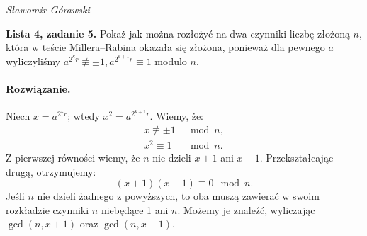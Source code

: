 \documentclass{article}
\begin{document}
\begin{flushright}
\textit{Sławomir Górawski}
\end{flushright}
\bigskip

\noindent\textbf{Lista 4, zadanie 5.}
Pokaż jak można rozłożyć na dwa czynniki liczbę złożoną $n$,
która w teście Millera--Rabina okazała się złożona,
ponieważ dla pewnego $a$ wyliczyliśmy
$a^{2^{k}r} \not\equiv \pm 1, a^{2^{k + 1}r} \equiv 1$ modulo $n$.

\paragraph{Rozwiązanie.}
Niech $x = a^{2^{k}r}$; wtedy $x^2 = a^{2^{k + 1}r}$. Wiemy, że:
\begin{align*}
    x \not\equiv \pm 1 &\mod n, \\
    x^2 \equiv 1 &\mod n.
\end{align*}
Z pierwszej równości wiemy, że $n$ nie dzieli $x + 1$ ani $x - 1$.
Przekształcając drugą, otrzymujemy:
\[
    (x + 1)(x - 1) \equiv 0 \mod n.
\]
Jeśli $n$ nie dzieli żadnego z powyższych,
to oba muszą zawierać w swoim rozkładzie czynniki $n$
niebędące 1 ani $n$. Możemy je znaleźć,
wyliczając $\gcd(n, x + 1)$ oraz $\gcd(n, x - 1)$.
\end{document}
